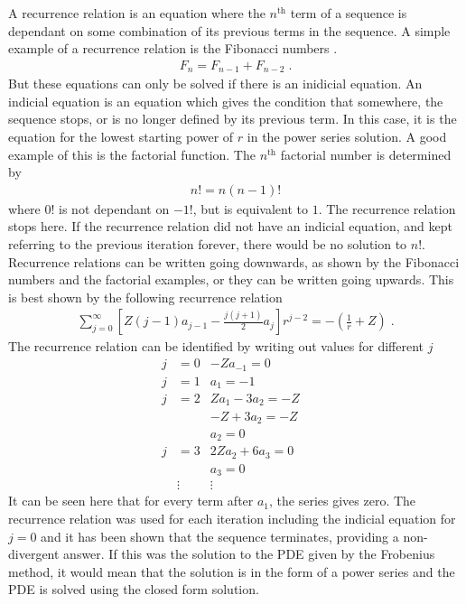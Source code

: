         A recurrence relation is an equation where the $n^{\text{th}}$ term of a sequence is dependant on some combination of its previous terms in the sequence. A simple example of a recurrence relation is the Fibonacci numbers \cite{Liber_Abaci}.
        \begin{align}
            F_n = F_{n - 1} + F_{n - 2}\;.
        \end{align}
        \noindent But these equations can only be solved if there is an inidicial equation. An indicial equation is an equation which gives the condition that somewhere, the sequence stops, or is no longer defined by its previous term. In this case, it is the equation for the lowest starting power of $r$ in the power series solution. A good example of this is the factorial function. The $n^{\text{th}}$ factorial number is determined by 
        \begin{align}
            n! = n(n-1)!
        \end{align}
        \noindent where $0!$ is not dependant on $-1!$, but is equivalent to $1$. The recurrence relation stops here. If the recurrence relation did not have an indicial equation, and kept referring to the previous iteration forever, there would be no solution to $n!$. Recurrence relations can be written going downwards, as shown by the Fibonacci numbers and the factorial examples, or they can be written going upwards. This is best shown by the following recurrence relation 
        \begin{align}
            \sum_{j = 0}^\infty \left[ Z(j - 1) a_{j - 1} - \frac{j(j+1)}{2} a_j \right] r^{j - 2} = -\left(\frac{1}{r} + Z\right)\;.
        \end{align}
        \noindent The recurrence relation can be identified by writing out values for different $j$ 
        \begin{align}
            j &= 0 & -Za_{-1} = 0&\\ \nonumber
            j &= 1 & a_1 = -1&\\ \nonumber
            j &= 2 & Za_1 - 3a_2 = -Z&\\ \nonumber
            & & -Z + 3a_2 = -Z&\\ \nonumber
            & & a_2 = 0&\\ \nonumber
            j &= 3 & 2Za_2 + 6a_3 = 0&\\ \nonumber
            & & a_3 = 0&\\ \nonumber
            & \vdots & \vdots &
        \end{align}
        \noindent It can be seen here that for every term after $a_1$, the series gives zero. The recurrence relation was used for each iteration including the indicial equation for $j = 0$ and it has been shown that the sequence terminates, providing a non-divergent answer. If this was the solution to the PDE given by the Frobenius method, it would mean that the solution is in the form of a power series and the PDE is solved using the closed form solution.


